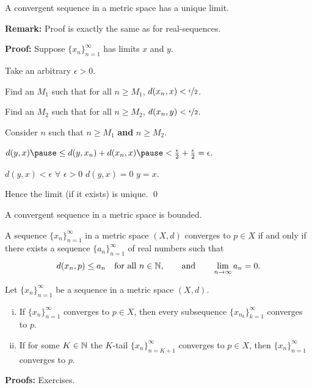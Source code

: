 \documentclass[10pt,aspectratio=149]{beamer}
\begin{document}
\begin{frame}

\begin{proposition}
A convergent sequence in a metric space has a unique limit.
\end{proposition}

\pause
\textbf{Remark:} Proof is exactly the same as for real-sequences.

\pause
\medskip

\textbf{Proof:}
Suppose $\{ x_n \}_{n=1}^\infty$ has limits $x$ and $y$.

\pause
Take an arbitrary $\epsilon > 0$.

\pause
Find an $M_1$ such that for all $n \geq M_1$,
\quad
$d(x_n,x) < \nicefrac{\epsilon}{2}$.


\pause
Find an $M_2$ such that for all $n \geq M_2$,
\quad
$d(x_n,y) < \nicefrac{\epsilon}{2}$.

\pause
Consider $n$ such that $n \geq M_1$ \textbf{and} $n \geq M_2$.

\pause
$
d(y,x)
\pause
\leq
d(y,x_n)+d(x_n,x)
\pause
<
\frac{\epsilon}{2} + \frac{\epsilon}{2} = \epsilon .
$

\pause
$d(y,x) < \epsilon$ $\forall$  $\epsilon > 0$ \wthus $d(y,x) = 0$
\pause
\wthus $y=x$.

\pause
Hence the limit (if it exists) is unique.
\qed

\end{frame}

\begin{frame}

\begin{proposition}
A convergent sequence in a metric space is bounded.
\end{proposition}

\pause
\begin{proposition}
A sequence $\{ x_n \}_{n=1}^\infty$ in a metric space $(X,d)$ converges to $p \in X$
if and only
if there exists a sequence $\{ a_n \}_{n=1}^\infty$ of real numbers such that
\begin{equation*}
d(x_n,p) \leq a_n \quad \text{for all } n \in {\mathbb{N}},
\qquad
\text{and}
\qquad
\lim_{n\to\infty} a_n = 0.
\end{equation*}
\end{proposition}

\pause
\begin{proposition}
Let $\{ x_n \}_{n=1}^\infty$ be a sequence in a metric space $(X,d)$.
\begin{enumerate}[(i)]
\item
\pause
If $\{ x_n \}_{n=1}^\infty$ converges to $p \in X$, then every
subsequence $\{ x_{n_k} \}_{k=1}^\infty$
converges to $p$.
\item
\pause
If for some $K \in {\mathbb{N}}$ the $K$-tail $\{ x_n \}_{n=K+1}^\infty$
converges to $p \in X$, then
 $\{ x_n \}_{n=1}^\infty$ converges to $p$.
\end{enumerate}
\end{proposition}

\pause
\textbf{Proofs:} Exercises.

\end{frame}
\end{document}
